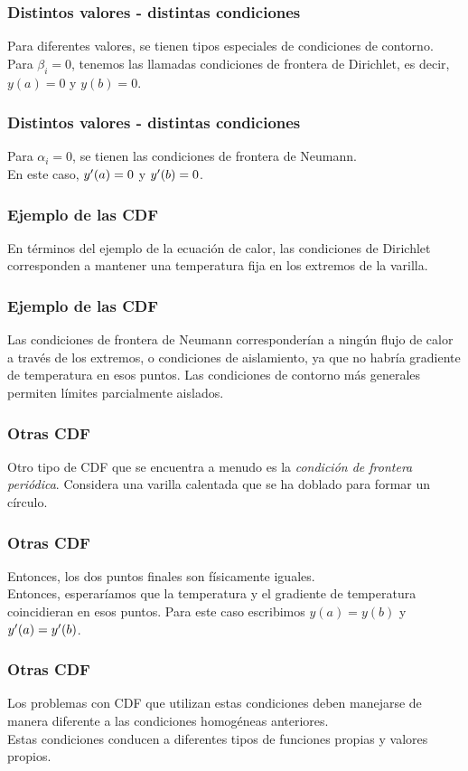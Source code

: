 \documentclass[12pt]{beamer}
\begin{document}
\begin{frame}
\frametitle{Distintos valores - distintas condiciones}
Para diferentes valores, se tienen tipos especiales de condiciones de contorno.
\\
\bigskip
\pause
Para $\beta_{i} = 0$, tenemos las llamadas condiciones de frontera de Dirichlet, es decir, $y (a) = 0$ y $y (b) = 0$.
\end{frame}
\begin{frame}
\frametitle{Distintos valores - distintas condiciones}
Para $\alpha_{i} = 0$, se tienen las condiciones de frontera de Neumann.
\\
\bigskip
\pause
En este caso, ${y}^{\prime} (a) = 0$ y ${y}^{\prime} (b) = 0$.
\end{frame}
\begin{frame}
\frametitle{Ejemplo de las CDF}
En términos del ejemplo de la ecuación de calor, las condiciones de Dirichlet corresponden a mantener una temperatura fija en los extremos de la varilla.
\end{frame}
\begin{frame}
\frametitle{Ejemplo de las CDF}
Las condiciones de frontera de Neumann corresponderían a ningún flujo de calor a través de los extremos, o condiciones de aislamiento, ya que no habría gradiente de temperatura en esos puntos. \pause Las condiciones de contorno más generales permiten límites parcialmente aislados.
\end{frame}
\begin{frame}
\frametitle{Otras CDF}
Otro tipo de CDF que se encuentra a menudo es la \emph{condición de frontera periódica}.
\pause
Considera una varilla calentada que se ha doblado para formar un círculo.
\end{frame}
\begin{frame}
\frametitle{Otras CDF}
Entonces, los dos puntos finales son físicamente iguales. 
 \\
 \bigskip
 \pause
 Entonces, esperaríamos que la temperatura y el gradiente de temperatura coincidieran en esos puntos. Para este caso escribimos $y (a) = y (b)$ y ${y}^{\prime} (a) = {y}^{\prime} (b)$.
\end{frame}
\begin{frame}
\frametitle{Otras CDF}
Los problemas con CDF que utilizan estas condiciones deben manejarse de manera diferente a las condiciones homogéneas anteriores.
\\
\bigskip
\pause
Estas condiciones conducen a diferentes tipos de funciones propias y valores propios.
\end{frame}
\end{document}
